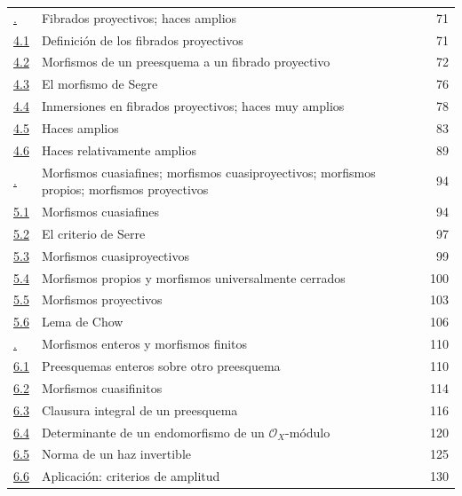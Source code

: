 \documentclass[oneside,10pt]{amsart}
\begin{document}
\begin{longtable}{@{}p{}p{}r@{}}
\hyperref[section:II.4-fr]{\textsection4.} & Fibrados proyectivos; haces amplios & 71\\
\hyperref[subsection:II.4.1-fr]{4.1} & Definición de los fibrados proyectivos & 71\\
\hyperref[subsection:II.4.2-fr]{4.2} & Morfismos de un preesquema a un fibrado proyectivo & 72\\
\hyperref[subsection:II.4.3-fr]{4.3} & El morfismo de Segre & 76\\
\hyperref[subsection:II.4.4-fr]{4.4} & Inmersiones en fibrados proyectivos; haces muy amplios & 78\\
\hyperref[subsection:II.4.5-fr]{4.5} & Haces amplios & 83\\
\hyperref[II.4.6-fr]{4.6} & Haces relativamente amplios & 89\\
\hyperref[section:II.5-fr]{\textsection5.} & Morfismos cuasiafines; morfismos cuasiproyectivos; morfismos propios; morfismos proyectivos & 94\\
\hyperref[subsection:II.5.1-fr]{5.1} & Morfismos cuasiafines & 94\\
\hyperref[subsection:II.5.2-fr]{5.2} & El criterio de Serre & 97\\
\hyperref[subsection:II.5.3-fr]{5.3} & Morfismos cuasiproyectivos & 99\\
\hyperref[subsection:II.5.4-fr]{5.4} & Morfismos propios y morfismos universalmente cerrados & 100\\
\hyperref[subsection:II.5.5-fr]{5.5} & Morfismos proyectivos & 103\\
\hyperref[subsection:II.5.6-fr]{5.6} & Lema de Chow & 106\\
\hyperref[section:II.6-fr]{\textsection6.} & Morfismos enteros y morfismos finitos & 110\\
\hyperref[subsection:II.6.1-fr]{6.1} & Preesquemas enteros sobre otro preesquema & 110\\
\hyperref[subsection:II.6.2-fr]{6.2} & Morfismos cuasifinitos & 114\\
\hyperref[subsection:II.6.3-fr]{6.3} & Clausura integral de un preesquema & 116\\
\hyperref[subsection:II.6.4-fr]{6.4} & Determinante de un endomorfismo de un $\mathcal{O}_X$-módulo & 120\\
\hyperref[subsection:II.6.5-fr]{6.5} & Norma de un haz invertible & 125\\
\hyperref[subsection:II.6.6-fr]{6.6} & Aplicación: criterios de amplitud & 130\\

\end{longtable}
\end{document}

